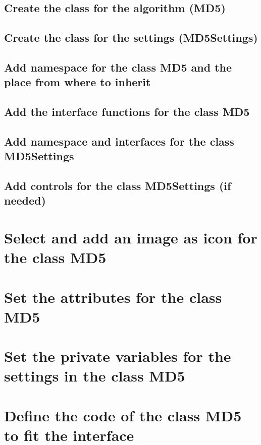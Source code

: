 \subsection{Create the class for the algorithm (MD5)}\label{sec:CreateTheClassForTheAlgorithmMD5}
\subsection{Create the class for the settings (MD5Settings)}\label{sec:CreateTheClassForTheSettingsMD5Settings}
\subsection{Add namespace for the class MD5 and the place from where to inherit}
\label{sec:AddNamespaceForTheClassMD5AndThePlaceFromWhereToInherit}
\subsection{Add the interface functions for the class MD5}\label{sec:AddTheInterfaceFunctionsForTheClassMD5}
\subsection{Add namespace and interfaces for the class MD5Settings}\label{sec:AddNamespaceAndInterfacesForTheClassMD5Settings}
\subsection{Add controls for the class MD5Settings (if needed)}\label{sec:AddControlsForTheClassMD5SettingsIfNeeded}
\section{Select and add an image as icon for the class MD5}\label{sec:SelectAndAddAnImageAsIconForTheClassMD5}
\section{Set the attributes for the class MD5}\label{sec:SetTheAttributesForTheClassMD5}
\section{Set the private variables for the settings in the class MD5}
\label{sec:SetThePrivateVariablesForTheSettingsInTheClassMD5}
\section{Define the code of the class MD5 to fit the interface}\label{sec:DefineTheCodeOfTheClassMD5ToFitTheInterface}
